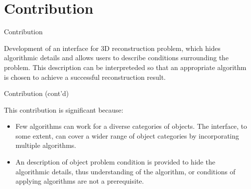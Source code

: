 \documentclass[10pt]{beamer}
\begin{document}
\section{Contribution}
\begin{frame}{Contribution}

Development of an interface for 3D reconstruction problem, which hides algorithmic details and allows users to describe conditions surrounding the problem. This description can be interpreteded so that an appropriate algorithm is chosen to achieve a successful reconstruction result.

\end{frame}

\begin{frame}{Contribution (cont'd)}

This contribution is significant because:
\begin{itemize}
\item Few algorithms can work for a diverse categories of objects. The interface, to some extent, can cover a wider range of object categories by incorporating multiple algorithms.
\item An description of object problem condition is provided to hide the algorithmic details, thus understanding of the algorithm, or conditions of applying algorithms are not a prerequisite.
\end{itemize}

\end{frame}

\end{document}
